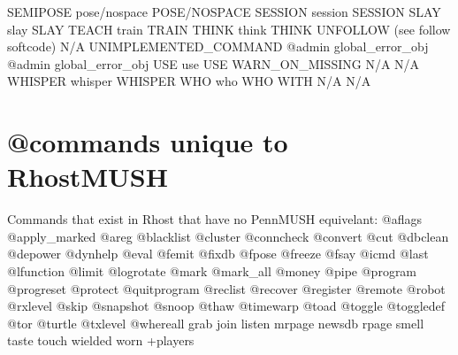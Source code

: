 \documentclass[letterpaper,10pt,english]{sphinxmanual}
\begin{document}
\begin{description}
SEMIPOSE                pose/nospace                   POSE/NOSPACE
SESSION                 session                        SESSION
SLAY                    slay                           SLAY
TEACH                   train                          TRAIN
THINK                   think                          THINK
UNFOLLOW                (see follow softcode)          N/A
UNIMPLEMENTED\_COMMAND   @admin global\_error\_obj        @admin global\_error\_obj
USE                     use                            USE
WARN\_ON\_MISSING         N/A                            N/A
WHISPER                 whisper                        WHISPER
WHO                     who                            WHO
WITH                    N/A                            N/A

\end{description}


\section{@commands unique to RhostMUSH}
\label{\detokenize{differences:commands-unique-to-rhostmush}}
\sphinxAtStartPar
Commands that exist in Rhost that have no PennMUSH equivelant:
@aflags                      @apply\_marked                 @areg
@blacklist                   @cluster                      @conncheck
@convert                     @cut                          @dbclean
@depower                     @dynhelp                      @eval
@femit                       @fixdb                        @fpose
@freeze                      @fsay                         @icmd
@last                        @lfunction                    @limit
@logrotate                   @mark                         @mark\_all
@money                       @pipe                         @program
@progreset                   @protect                      @quitprogram
@reclist                     @recover                      @register
@remote                      @robot                        @rxlevel
@skip                        @snapshot                     @snoop
@thaw                        @timewarp                     @toad
@toggle                      @toggledef                    @tor
@turtle                      @txlevel                      @whereall
grab                         join                          listen
mrpage                       newsdb                        rpage
smell                        taste                         touch
wielded                      worn                          +players
\end{document}
